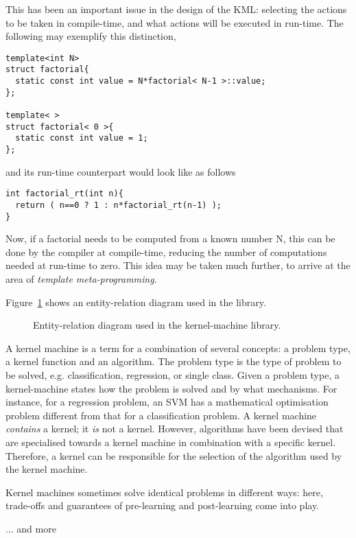 \documentclass{article}
\begin{document}
This has been an important issue in the design of the KML: selecting 
the actions to be taken in compile-time, and what actions will be executed in
run-time. The following may exemplify this distinction,

\highlightcpp{}
\begin{verbatim}
template<int N>
struct factorial{
  static const int value = N*factorial< N-1 >::value;
};

template< >
struct factorial< 0 >{
  static const int value = 1;
};
\end{verbatim}
and its run-time counterpart would look like as follows

\highlightcpp{}
\begin{verbatim}
int factorial_rt(int n){
  return ( n==0 ? 1 : n*factorial_rt(n-1) );
}
\end{verbatim}
%
Now, if a factorial needs to be computed from a known number N, this
can be done by the compiler at compile-time, reducing the number of
computations needed at run-time to zero. 
%
This idea may be taken much further, to arrive at the area of 
\emph{template meta-programming}.


Figure~\ref{figure:design_kml} shows an entity-relation diagram
used in the library. %
\begin{figure}
%
\caption{Entity-relation diagram used in the kernel-machine library.}
\label{figure:design_kml}
\end{figure}
A kernel machine is a term for a combination of several concepts:
a problem type, a kernel function and an algorithm. The problem type is the
type of problem to be solved, e.g. classification, regression, or
single class. Given a problem type, a kernel-machine states how the
problem is solved and by what mechanisms. For instance, for a regression
problem, an SVM has a mathematical optimisation problem different
from that for a classification problem. A kernel machine \emph{contains}
a kernel; it \emph{is} not a kernel. However, algorithms have been
devised that are specialised towards a kernel machine in combination
with a specific kernel. Therefore, a kernel can be responsible for
the selection of the algorithm used by the kernel machine.

Kernel machines sometimes solve identical problems in different ways:
here, trade-offs and guarantees of pre-learning and post-learning
come into play.


... and more




\end{document}

